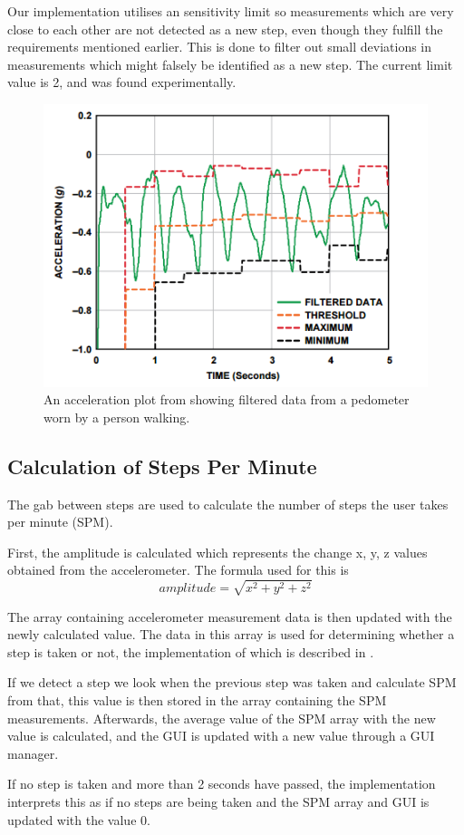 Our implementation utilises an sensitivity limit so measurements which are very close to each other are not detected as a new step, even though they fulfill the requirements mentioned earlier. This is done to filter out small deviations in measurements which might falsely be identified as a new step. The current limit value is 2, and was found experimentally.
\begin{figure}[h!]
  \centering
    \includegraphics[scale=0.8]{Images/accPlot.png}
  \caption{An acceleration plot from \citet[p. 2]{zhao:pedometer} showing filtered data from a pedometer worn by a person walking.}
  \label{fig:zhaoGraph}
\end{figure}


\subsection{Calculation of Steps Per Minute}
The gab between steps are used to calculate the number of steps the user takes per minute (SPM).

First, the amplitude is calculated which represents the change x, y, z values obtained from the accelerometer. The formula used for this is $$amplitude = \sqrt{x^{2} + y^{2} + z^{2}}$$

The array containing accelerometer measurement data is then updated with the newly calculated value. The data in this array is used for determining whether a step is taken or not, the implementation of which is described in .

If we detect a step we look when the previous step was taken and calculate SPM from that, this value is then stored in the array containing the SPM measurements. Afterwards, the average value of the SPM array with the new value is calculated, and the GUI is updated with a new value through a GUI manager.

If no step is taken and more than 2 seconds have passed, the implementation interprets this as if no steps are being taken and the SPM array and GUI is updated with the value 0.